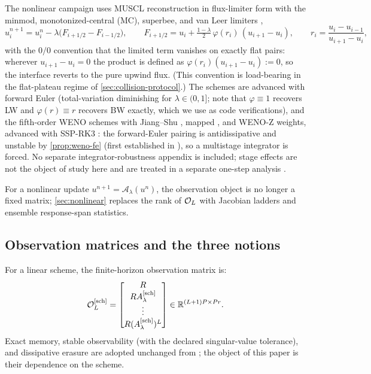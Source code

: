 \documentclass[pdflatex,sn-mathphys-num]{sn-jnl}%
\theoremstyle{thmstyleone}%
\theoremstyle{thmstyletwo}%
\theoremstyle{thmstylethree}%
\newcommand{\R}{\mathbb R}
\newcommand{\OL}{{\cal O}_L}
\newcommand{\Asch}{A^{[\rm sch]}_\lambda}
\begin{document}
The nonlinear campaign uses MUSCL reconstruction \cite{vanLeer1979} in flux-limiter form with the minmod, monotonized-central (MC), superbee, and van Leer limiters \cite{Harten1983,Sweby1984}, \[ u_i^{n+1}=u_i^n-\lambda\bigl(F_{i+1/2}-F_{i-1/2}\bigr),\qquad F_{i+1/2}=u_i+\tfrac{1-\lambda}{2}\,\varphi(r_i)\,(u_{i+1}-u_i),\qquad r_i=\frac{u_i-u_{i-1}}{u_{i+1}-u_i}, \] with the $0/0$ convention that the limited term vanishes on exactly flat pairs: wherever $u_{i+1}-u_i=0$ the product is defined as $\varphi(r_i)(u_{i+1}-u_i):=0$, so the interface reverts to the pure upwind flux.
(This convention is load-bearing in the flat-plateau regime of \cref{sec:collision-protocol}.)
The schemes are advanced with forward Euler (total-variation diminishing for $\lambda\in(0,1]$; note that $\varphi\equiv1$ recovers LW and $\varphi(r)\equiv r$ recovers BW exactly, which we use as code verifications), and the fifth-order WENO schemes with Jiang--Shu \cite{JiangShu1996}, mapped \cite{HenrickAslamPowers2005}, and WENO-Z \cite{BorgesCarmonaCostaDon2008} weights, advanced with SSP-RK3 \cite{GottliebShuTadmor2001}: the forward-Euler pairing is antidissipative and unstable by \cref{prop:weno-fe} (first established in \cite{WangSpiteri2007}), so a multistage integrator is forced.
No separate integrator-robustness appendix is included; stage effects are not the object of study here and are treated in a separate one-step analysis \cite{PolemitisChristakisDrikakis2026onestep}.

For a nonlinear update $u^{n+1}=\mathcal A_\lambda(u^n)$, the observation object is no longer a fixed matrix; \cref{sec:nonlinear} replaces the rank of $\OL$ with Jacobian ladders and ensemble response-span statistics.

\subsection{Observation matrices and the three notions}\label{sec:observation}

For a linear scheme, the finite-horizon observation matrix is:
\[ \OL^{[\rm sch]} =
\begin{bmatrix}
R\\ R\Asch\\ \vdots\\ R(\Asch)^L
\end{bmatrix}
\in\R^{(L+1)P\times Pr}. \]
Exact memory, stable observability (with the declared singular-value tolerance), and dissipative erasure are adopted unchanged from \cite{PolemitisChristakisDrikakis2026FVerasure}; the object of this paper is their dependence on the scheme.
\end{document}
